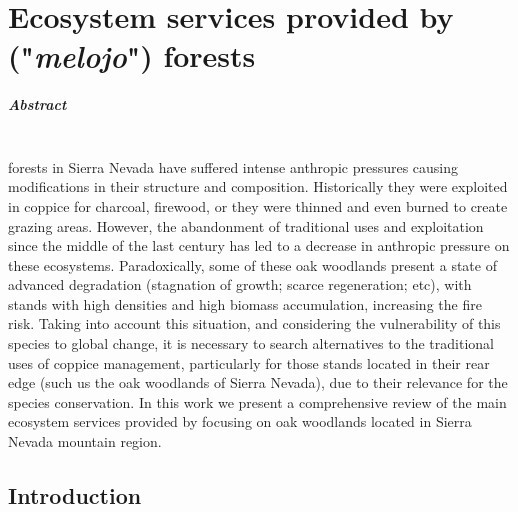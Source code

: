 %
\chapter{\textcolor{ctcolormain}{Ecosystem services provided by \Qpw ("\textit{melojo}") forests}}\label{sec:es}

\mbox{}
\vfill


\newpage

\paragraph{Abstract} \mbox{} \\
\Qp forests in Sierra Nevada have suffered intense anthropic pressures causing modifications in their structure and composition. Historically they were exploited in coppice for charcoal, firewood, or they were thinned and even burned to create grazing areas. However, the abandonment of traditional uses and exploitation since the middle of the last century has led to a decrease in anthropic pressure on these ecosystems. Paradoxically, some of these oak woodlands present a state of advanced degradation (stagnation of growth; scarce regeneration; etc), with stands with high densities and high biomass accumulation, increasing the fire risk. Taking into account this situation, and considering the vulnerability of this species to global change, it is necessary to search alternatives to the traditional uses of coppice management, particularly for those stands located in their rear edge (such us the oak woodlands of Sierra Nevada), due to their relevance for the species conservation. 
In this work we present a comprehensive review of the main ecosystem services provided by \Qpy focusing on oak woodlands located in Sierra Nevada mountain region.
\newpage

\section{Introduction}\label{sec:es:intro}

